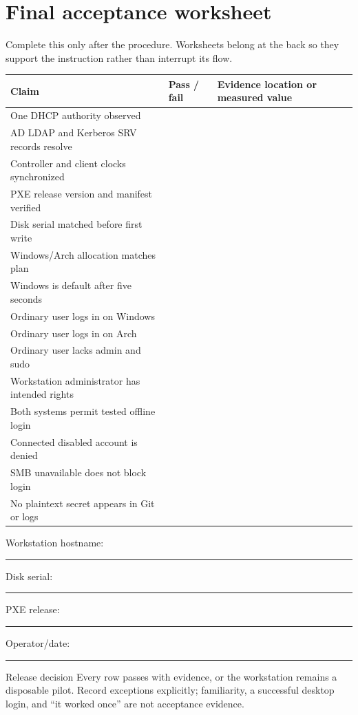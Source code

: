 \clearpage
\section{Final acceptance worksheet}

Complete this only after the procedure. Worksheets belong at the back so they
support the instruction rather than interrupt its flow.

\begin{tabularx}{\linewidth}{@{}p{.31\linewidth}p{.20\linewidth}L@{}}
\toprule
\textbf{Claim} & \textbf{Pass / fail} & \textbf{Evidence location or measured value}\\
\midrule
One DHCP authority observed & & \\
AD LDAP and Kerberos SRV records resolve & & \\
Controller and client clocks synchronized & & \\
PXE release version and manifest verified & & \\
Disk serial matched before first write & & \\
Windows/Arch allocation matches plan & & \\
Windows is default after five seconds & & \\
Ordinary user logs in on Windows & & \\
Ordinary user logs in on Arch & & \\
Ordinary user lacks admin and sudo & & \\
Workstation administrator has intended rights & & \\
Both systems permit tested offline login & & \\
Connected disabled account is denied & & \\
SMB unavailable does not block login & & \\
No plaintext secret appears in Git or logs & & \\
\bottomrule
\end{tabularx}

\medskip
\noindent Workstation hostname:\ \rule{.38\linewidth}{.35pt}\hfill
Disk serial:\ \rule{.30\linewidth}{.35pt}

\medskip
\noindent PXE release:\ \rule{.30\linewidth}{.35pt}\hfill
Operator/date:\ \rule{.35\linewidth}{.35pt}

\begin{gate}{Release decision}
Every row passes with evidence, or the workstation remains a disposable pilot.
Record exceptions explicitly; familiarity, a successful desktop login, and
``it worked once'' are not acceptance evidence.
\end{gate}

